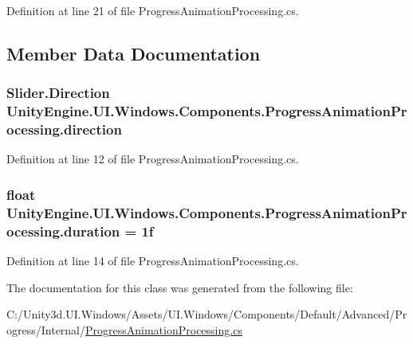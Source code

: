 Definition at line 21 of file Progress\+Animation\+Processing.\+cs.



\subsection{Member Data Documentation}
\hypertarget{class_unity_engine_1_1_u_i_1_1_windows_1_1_components_1_1_progress_animation_processing_a8fc06ea6de9756378a1f3d04ee2763ea}{}
\subsubsection[{direction}]{\setlength{\rightskip}{0pt plus 5cm}Slider.\+Direction Unity\+Engine.\+U\+I.\+Windows.\+Components.\+Progress\+Animation\+Processing.\+direction}\label{class_unity_engine_1_1_u_i_1_1_windows_1_1_components_1_1_progress_animation_processing_a8fc06ea6de9756378a1f3d04ee2763ea}


Definition at line 12 of file Progress\+Animation\+Processing.\+cs.

\hypertarget{class_unity_engine_1_1_u_i_1_1_windows_1_1_components_1_1_progress_animation_processing_ab3bf8ecfd31fb624983b62f78381b962}{}
\subsubsection[{duration}]{\setlength{\rightskip}{0pt plus 5cm}float Unity\+Engine.\+U\+I.\+Windows.\+Components.\+Progress\+Animation\+Processing.\+duration = 1f}\label{class_unity_engine_1_1_u_i_1_1_windows_1_1_components_1_1_progress_animation_processing_ab3bf8ecfd31fb624983b62f78381b962}


Definition at line 14 of file Progress\+Animation\+Processing.\+cs.



The documentation for this class was generated from the following file\+:\begin{DoxyCompactItemize}
\item 
C\+:/\+Unity3d.\+U\+I.\+Windows/\+Assets/\+U\+I.\+Windows/\+Components/\+Default/\+Advanced/\+Progress/\+Internal/\hyperlink{_progress_animation_processing_8cs}{Progress\+Animation\+Processing.\+cs}\end{DoxyCompactItemize}
